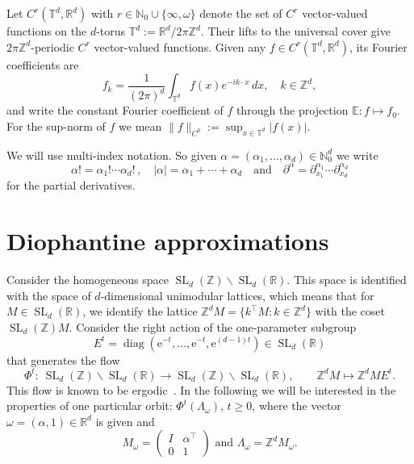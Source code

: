 \documentclass[12pt,reqno,a4paper]{amsart}%
\numberwithin{equation}{section}
\newcommand{\Ee}{{\mathbb{E}}}
\newcommand{\Nn}{{\mathbb{N}}}
\newcommand{\Rr}{{\mathbb{R}}}
\newcommand{\Tt}{{\mathbb{T}}}
\newcommand{\Zz}{{\mathbb{Z}}}
\def\e{\mathrm{e}}
\def\diag{\operatorname{diag}}
\def\SL{\operatorname{SL}}
\def\SLZ{\SL_d(\Zz)}
\def\SLR{\SL_d(\Rr)}
\def\veck{{\text{\boldmath$k$}}}
\def\veck{{\text{$k$}}}
\begin{document}
%

Let $C^r(\Tt^d,\Rr^d)$ with $r\in\Nn_0\cup\{\infty,\omega\}$ denote the set of $C^r$ vector-valued functions on the $d$-torus \( \Tt^d := \Rr^d / 2\pi\Zz^d \). Their lifts to the universal cover give $2\pi\Zz^d$-periodic $C^r$ vector-valued functions.  
Given any $f\in C^r(\Tt^d,\Rr^d)$, its Fourier coefficients are
$$
f_k=\frac{1}{(2\pi)^d}\int_{\Tt^d}f(x)e^{-ik\cdot x}\,dx,\quad k\in\Zz^d,
$$
and write the constant Fourier coefficient of $f$ through the projection 
$\Ee \colon f\mapsto f_0$.
For the sup-norm of $f$ we mean $\|f\|_{C^0}:=\sup_{x\in\Tt^d}|f(x)|$. 

We will use multi-index notation. So given $\alpha=(\alpha_1,\ldots,\alpha_d)\in\Nn_0^d$ we write
$$
\alpha!=\alpha_1!\cdots \alpha_d!\,,\quad |\alpha|=\alpha_1+\cdots+\alpha_d\quad\text{and}\quad \partial^\alpha=\partial^{\alpha_1}_{x_1}\cdots\partial^{\alpha_d}_{x_d}
$$
for the partial derivatives.


\section{Diophantine approximations}
\label{sec:diophantine approx}
	
	
	Consider the homogeneous space $\SLZ\backslash \SLR$. This space is identified with the space of $d$-dimensional unimodular lattices, which means that for $M\in \SLR$, we identify the lattice $\Zz^d M=\{k^\top M:\veck\in\Zz^d \}$ with the coset $\SLZ M$.
	Consider the right action of the one-parameter subgroup
	$$
	E^t=\diag(\e^{-t}, \dots, \e^{-t}, \e^{(d-1)t}) \in \SLR
	$$
	that generates the flow
	\begin{equation}\label{def geod flow}
		\Phi^t\colon \ \SLZ\backslash \SLR \to\SLZ\backslash \SLR,
		\qquad
		\Zz^d M\mapsto \Zz^d M E^t.
	\end{equation}
	This flow is known to be ergodic~\cite{Bekka2000}. 
	In the following we will be interested in the properties of one particular orbit: $\Phi^t(\Lambda_\omega)$, $t\geq 0$, where the vector $\omega=(\alpha,1)\in\Rr^d$ is given and
	 \begin{equation}
		M_{\omega}=
		\begin{pmatrix}
			I & \alpha^\top \\
			0 & 1
		\end{pmatrix} \text{ and } \Lambda_{\omega}=\Zz^d M_{\omega}.
	\end{equation}
	
\end{document}

